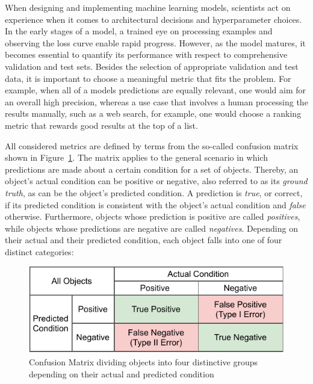 When designing and implementing machine learning models, scientists act on experience when it comes to architectural decisions and hyperparameter choices. In the early stages of a model, a trained eye on processing examples and observing the loss curve enable rapid progress. However, as the model matures, it becomes essential to quantify its performance with respect to comprehensive validation and test sets. Besides the selection of appropriate validation and test data, it is important to choose a meaningful metric that fits the problem. For example, when all of a models predictions are equally relevant, one would aim for an overall high precision, whereas a use case that involves a human processing the results manually, such as a web search, for example, one would choose a ranking metric that rewards good results at the top of a list.

All considered metrics are defined by terms from the so-called confusion matrix shown in Figure~\ref{fig:2_basics/2_metrics/1_confusion_matrix}. The matrix applies to the general scenario in which predictions are made about a certain condition for a set of objects. Thereby, an object's actual condition can be positive or negative, also referred to as its \emph{ground truth}, as can be the object's predicted condition. A prediction is \emph{true}, or correct, if its predicted condition is consistent with the object's actual condition and \emph{false} otherwise. Furthermore, objects whose prediction is positive are called \emph{positives}, while objects whose predictions are negative are called \emph{negatives}. Depending on their actual and their predicted condition, each object falls into one of four distinct categories:

\begin{figure}[t]
    \centering
    \includegraphics{2_basics/2_metrics/confusion_matrix}
    \caption{Confusion Matrix dividing objects into four distinctive groups depending on their actual and predicted condition}
    \label{fig:2_basics/2_metrics/1_confusion_matrix}
\end{figure}

